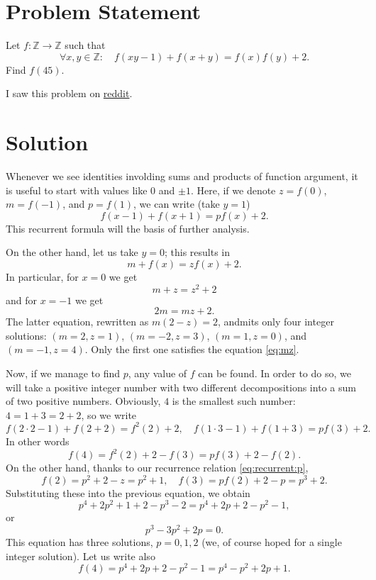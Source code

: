 \documentclass[12pt, a4paper]{article}
\begin{document}
\section*{Problem Statement}

Let $f : \mathbb{Z} \to \mathbb{Z}$ such that
\begin{equation}
\forall x,y\in \mathbb Z:\quad f(xy-1) + f(x+y) = f(x)f(y)+2. \label{eq:initial}
\end{equation}
Find $f(45)$.

I saw this problem on \href{https://www.reddit.com/r/PassTimeMath/comments/1q1w2mz/find_f45/}{reddit}.

\section*{Solution}
Whenever we see identities involding sums and products of function argument,
it is useful to start with values like $0$ and $\pm1$.
Here, if we denote $z = f(0)$, $m = f(-1)$, and $p=f(1)$, we can write (take $y=1$)
\begin{equation}
f(x-1) + f(x+1) = p f(x) + 2. \label{eq:recurrent:p}
\end{equation}
This recurrent formula will the basis of further analysis.

On the other hand, let us take $y=0$; this results in
\[
m + f(x) = z f(x) + 2.
\]
In particular, for $x=0$ we get
\begin{equation}
m + z = z^2 + 2 \label{eq:mz}
\end{equation}
and for $x=-1$ we get
\[2m=m z + 2.\]
The latter equation, rewritten as $m(2-z) = 2$, andmits only four integer solutions:
$(m=2, z=1)$, $(m=-2, z=3)$, $(m=1, z=0)$, and $(m=-1, z=4)$.
Only the first one satisfies the equation \eqref{eq:mz}.

Now, if we manage to find $p$, any value of $f$ can be found.
In order to do so, we will take a positive integer number with two different decompositions into a sum of two positive numbers.
Obviously, $4$ is the smallest such number: $4 = 1+3=2+2$, so we write
\[f(2\cdot2-1)+f(2+2) = f^2(2)+2,\quad f(1\cdot3-1)+f(1+3)=pf(3)+2.\]
In other words
\[
f(4) = f^2(2) + 2 - f(3) = pf(3)+2-f(2).
\]
On the other hand, thanks to our recurrence relation \eqref{eq:recurrent:p},
\[f(2) = p^2 +2 - z = p^2+1,\quad f(3) = pf(2)+ 2 - p = p^3+2.\]
Substituting these into the previous equation, we obtain
\[
p^4+2p^2+1 +2- p^3-2 = p^4 + 2p +2 - p^2 -1,
\]
or
\[
p^3 - 3p^2 + 2p = 0.
\]
This equation has three solutions, $p=0,1,2$ (we, of course hoped for a single integer solution).
Let us write also \[f(4) = p^4 + 2p + 2 - p^2 -1 = p^4 - p^2 + 2p +1.\]
\end{document}
